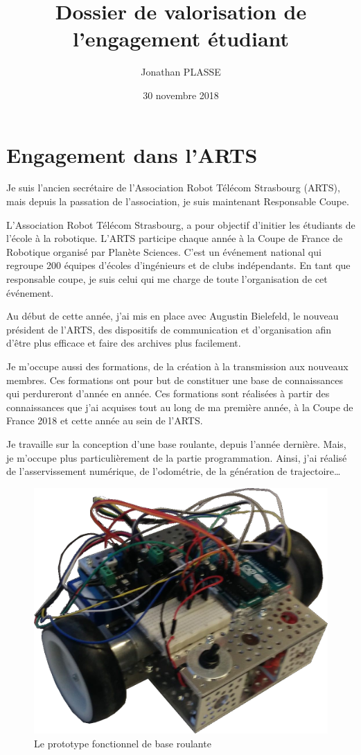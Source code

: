 \documentclass[12pt,a4paper]{article}
\title{Dossier de valorisation de l'engagement étudiant}
\author{Jonathan PLASSE}
\date{30 novembre 2018}
\begin{document}
\maketitle
\section*{Engagement dans l'ARTS}
Je suis l'ancien secrétaire de l'Association Robot Télécom Strasbourg (ARTS), mais depuis la passation de l'association, je suis maintenant Responsable Coupe.

L'Association Robot Télécom Strasbourg, a pour objectif d'initier les étudiants de l'école à la robotique.
L'ARTS participe chaque année à la Coupe de France de Robotique organisé par Planète Sciences. C'est un événement national qui regroupe 200 équipes d'écoles d'ingénieurs et de clubs indépendants. En tant que responsable coupe, je suis celui qui me charge de toute l'organisation de cet événement.

Au début de cette année, j'ai mis en place avec Augustin Bielefeld, le nouveau président de l'ARTS, des dispositifs de communication et d'organisation afin d'être plus efficace et faire des archives plus facilement.

Je m'occupe aussi des formations, de la création à la transmission aux nouveaux membres. Ces formations ont pour but de constituer une base de connaissances qui perdureront d'année en année. Ces formations sont réalisées à partir des connaissances que j'ai acquises tout au long de ma première année, à la Coupe de France 2018 et cette année au sein de l'ARTS.

Je travaille sur la conception d'une base roulante, depuis l'année dernière. Mais, je m'occupe plus particulièrement de la partie programmation. Ainsi, j'ai réalisé de l'asservissement numérique, de l'odométrie, de la génération de trajectoire…
\begin{figure}
	\centering
	\includegraphics[scale=0.2]{base_roulante.jpg}
	\caption{Le prototype fonctionnel de base roulante}
\end{figure}
\end{document}
